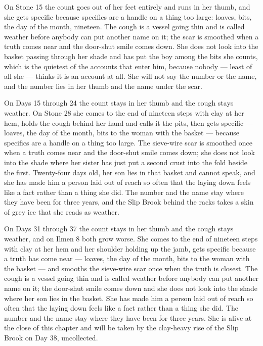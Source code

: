 \documentclass{design/chronicle}
\begin{document}
{On Stone 15 the count goes out of her feet entirely and runs in her thumb, and she gets specific because specifics are a handle on a thing too large: loaves, bits, the day of the month, nineteen. The cough is a vessel going thin and is called weather before anybody can put another name on it; the scar is smoothed when a truth comes near and the door-shut smile comes down. She does not look into the basket passing through her shade and has put the boy among the bits she counts, which is the quietest of the accounts that enter him, because nobody --- least of all she --- thinks it is an account at all. She will not say the number or the name, and the number lies in her thumb and the name under the scar.

On Days 15 through 24 the count stays in her thumb and the cough stays weather. On Stone 28 she comes to the end of nineteen steps with clay at her hem, holds the cough behind her hand and calls it the pits, then gets specific --- loaves, the day of the month, bits to the woman with the basket --- because specifics are a handle on a thing too large. The sieve-wire scar is smoothed once when a truth comes near and the door-shut smile comes down; she does not look into the shade where her sister has just put a second crust into the fold beside the first. Twenty-four days old, her son lies in that basket and cannot speak, and she has made him a person laid out of reach so often that the laying down feels like a fact rather than a thing she did. The number and the name stay where they have been for three years, and the Slip Brook behind the racks takes a skin of grey ice that she reads as weather.

On Days 31 through 37 the count stays in her thumb and the cough stays weather, and on Ilmen 8 both grow worse. She comes to the end of nineteen steps with clay at her hem and her shoulder holding up the jamb, gets specific because a truth has come near --- loaves, the day of the month, bits to the woman with the basket --- and smooths the sieve-wire scar once when the truth is closest. The cough is a vessel going thin and is called weather before anybody can put another name on it; the door-shut smile comes down and she does not look into the shade where her son lies in the basket. She has made him a person laid out of reach so often that the laying down feels like a fact rather than a thing she did. The number and the name stay where they have been for three years. She is alive at the close of this chapter and will be taken by the clay-heavy rise of the Slip Brook on Day 38, uncollected.

}
\end{document}
